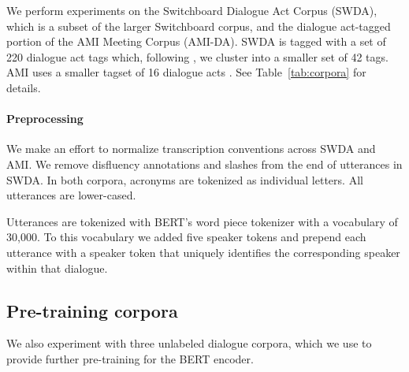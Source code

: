 \documentclass[11pt,a4paper]{article}
\begin{document}
We perform experiments on the Switchboard Dialogue Act Corpus (SWDA), 
which is a subset of the larger Switchboard corpus, 
and the dialogue act-tagged portion of the AMI Meeting Corpus (AMI-DA). 
SWDA is tagged with a set of 220 dialogue act tags which, following  \citet{jurafskySwitchboardSWBDDAMSLShallowDiscourseFunction1997a}, we cluster into a smaller set of 42 tags.
AMI uses a smaller tagset of 16 dialogue acts \citep{GuidelinesDialogueAct2005}.
See Table~\ref{tab:corpora} for details.


\paragraph{Preprocessing}

We make an effort to normalize transcription conventions across SWDA and AMI.
We remove disfluency annotations and slashes from the end of utterances in SWDA.
In both corpora, acronyms are tokenized as individual letters. 
All utterances are lower-cased.

Utterances are tokenized with BERT's word piece tokenizer with a vocabulary of 30,000.
To this vocabulary we added five speaker tokens and prepend each utterance with a speaker 
token that uniquely identifies the corresponding speaker within that dialogue.


\subsection{Pre-training corpora}

We also experiment with three unlabeled dialogue corpora, which we use to provide further pre-training for the BERT encoder.
\end{document}
